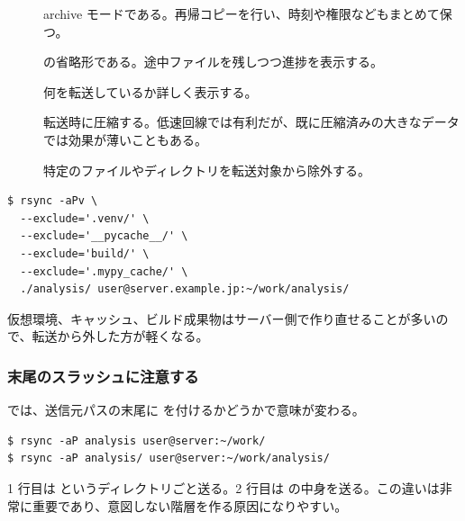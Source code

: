 \begin{description}
\item[] archive モードである。再帰コピーを行い、時刻や権限などもまとめて保つ。
\item[]  の省略形である。途中ファイルを残しつつ進捗を表示する。
\item[] 何を転送しているか詳しく表示する。
\item[] 転送時に圧縮する。低速回線では有利だが、既に圧縮済みの大きなデータでは効果が薄いこともある。
\item[] 特定のファイルやディレクトリを転送対象から除外する。
\end{description}

\begin{lstlisting}[numbers=none, xleftmargin=2\zw]
$ rsync -aPv \
  --exclude='.venv/' \
  --exclude='__pycache__/' \
  --exclude='build/' \
  --exclude='.mypy_cache/' \
  ./analysis/ user@server.example.jp:~/work/analysis/
\end{lstlisting}

仮想環境、キャッシュ、ビルド成果物はサーバー側で作り直せることが多いので、転送から外した方が軽くなる。

\subsubsection{末尾のスラッシュに注意する}

 では、送信元パスの末尾に \code{/} を付けるかどうかで意味が変わる。

\begin{lstlisting}[numbers=none, xleftmargin=2\zw]
$ rsync -aP analysis user@server:~/work/
$ rsync -aP analysis/ user@server:~/work/analysis/
\end{lstlisting}

1 行目は  というディレクトリごと送る。2 行目は \code{analysis} の中身を送る。この違いは非常に重要であり、意図しない階層を作る原因になりやすい。
